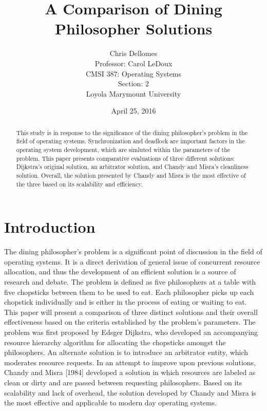 \documentclass{article}
\begin{document}
\title{A Comparison of Dining Philosopher Solutions}
\author{Chris Dellomes\\
Professor: Carol LeDoux\\
CMSI 387: Operating Systems\\
Section: 2\\
	Loyola Marymount University}

\date{April 25, 2016}

\maketitle

\begin{center}
\begin{abstract}
This study is in response to the significance of the dining philosopher's problem in the field of operating systems. Synchronization and deadlock are important factors in the operating system development, which are simluted within the parameters of the problem. This paper presents comparative evaluations of three different solutions: Dijkstra's original solution, an arbitrator solution, and Chandy and Misra's cleanliness solution. Overall, the solution presented by Chandy and Misra is the most effective of the three based on its scalability and efficiency.
\end{abstract}
\end{center}

\thispagestyle{empty}

\clearpage

\setcounter{page}{1}

\section{Introduction} The dining philosopher's problem is a significant point of discussion in the field of operating systems. It is a direct derivation of general issue of concurrent resource allocation, and thus the development of an efficient solution is a source of research and debate. The problem is defined as five philosophers at a table with five chopsticks between them to be used to eat. Each philosopher picks up each chopstick individually and is either in the process of eating or waiting to eat. This paper will present a comparison of three distinct solutions and their overall effectiveness based on the criteria established by the problem's parameters. The problem was first proposed by Edsger Dijkstra, who developed an accompanying resource hierarchy algorithm for allocating the chopsticks amongst the philosophers. An alternate solution is to introduce an arbitrator entity, which moderates resource requests. In an attempt to improve upon previous solutions, Chandy and Misra [1984] developed a solution in which resources are labeled as clean or dirty and are passed between requesting philosophers. Based on its scalability and lack of overhead, the solution developed by Chandy and Misra is the most effective and applicable to modern day operating systems.
\end{document}
